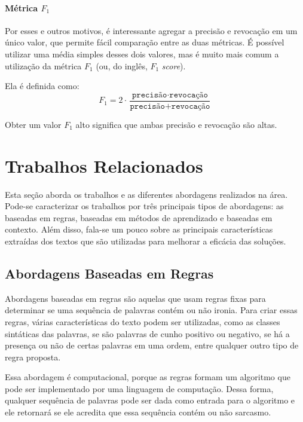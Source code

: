 \paragraph{Métrica $F_1$}%
\label{par:metrica_f_1_}

Por esses e outros motivos, é interessante agregar a precisão e revocação em um
único valor, que permite fácil comparação entre as duas métricas. É possível
utilizar uma média simples desses dois valores, mas é muito mais comum a
utilização da métrica $F_1$ (ou, do inglês, $F_1$ \textit{score}).

Ela é definida como:
\[
F_1=2\cdot
\dfrac{\texttt{precisão}\cdot\texttt{revocação}}
{\texttt{precisão}+\texttt{revocação}}
\]

Obter um valor $F_1$ alto significa que ambas precisão e revocação são altas.

\section{Trabalhos Relacionados}%
\label{sec:trabalhos_relacionados}

Esta seção aborda os trabalhos e as diferentes abordagens realizados na área.
Pode-se caracterizar os trabalhos por três principais tipos de abordagens: as
baseadas em regras, baseadas em métodos de aprendizado e baseadas em contexto.
Além disso, fala-se um pouco sobre as principais características extraídas dos
textos que são utilizadas para melhorar a eficácia das soluções.

\subsection{Abordagens Baseadas em Regras}%
\label{sub:abordagens_baseados_em_regras}

Abordagens baseadas em regras são aquelas que usam regras fixas para determinar
se uma sequência de palavras contém ou não ironia. Para criar essas regras,
várias características do texto podem ser utilizadas, como as classes sintáticas
das palavras, se são palavras de cunho positivo ou negativo, se há a presença ou
não de certas palavras em uma ordem, entre qualquer outro tipo de regra
proposta.

Essa abordagem é computacional, porque as regras formam um algoritmo que pode
ser implementado por uma linguagem de computação. Dessa forma, qualquer
sequência de palavras pode ser dada como entrada para o algoritmo e ele
retornará se ele acredita que essa sequência contém ou não sarcasmo.

